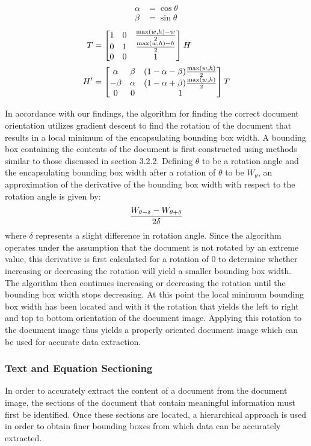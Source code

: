 \documentclass[10pt]{IEEEtran}
\begin{document}
\begin{align*}
\alpha &= \cos \theta \\
\beta &= \sin \theta
\end{align*}
\begin{align*}
T &= 
\left[
\begin{matrix}
1 & 0 & {\max(w,h) - w\over{2}} \\
0 & 1 & {\max(w,h) - h\over{2}} \\
0 & 0 & 1
\end{matrix}
\right]
H \\
H' &= 
\left[
\begin{matrix}
\alpha & \beta &  (1 - \alpha - \beta){\max(w,h)\over{2}}\\
-\beta & \alpha & (1 - \alpha + \beta){\max(w,h)\over{2}} \\
0 & 0 & 1
\end{matrix}
\right]
T
\end{align*}

In accordance with our findings, the algorithm for finding the correct document orientation utilizes  gradient descent to find the rotation of the document that results in a local minimum of the encapsulating bounding box width.  A bounding box containing the contents of the document is first constructed using methods similar to those discussed in section 3.2.2. Defining $\theta$ to be a rotation angle and the encapsulating bounding box width after a rotation of $\theta$ to be $W_{\theta}$, an approximation of the derivative of the bounding box width with respect to the rotation angle is given by:
\begin{align*}
{W_{\theta - \delta} - W_{\theta + \delta}\over{2\delta}}
\end{align*}
where $\delta$ represents a slight difference in rotation angle. Since the algorithm operates under the assumption that the document is not rotated by an extreme value, this derivative is first calculated for a rotation of 0 to determine whether increasing or decreasing the rotation will yield a smaller bounding box width. The algorithm then continues increasing or decreasing the rotation until the bounding box width stops decreasing. At this point the local minimum bounding box width has been located and with it the rotation that yields the left to right and top to bottom orientation of the document image. Applying this rotation to the document image thus yields a properly oriented document image which can be used for accurate data extraction.

\subsubsection{Text and Equation Sectioning}
In order to accurately extract the content of a document from the document image, the sections of the document that contain meaningful information must first be identified. Once these sections are located, a hierarchical approach is used in order to obtain finer bounding boxes from which data can be accurately extracted.
\end{document}
